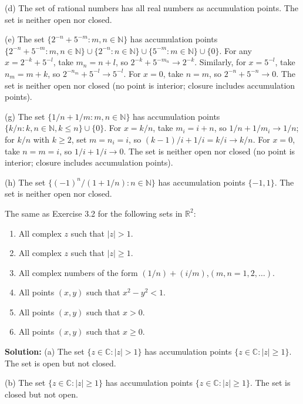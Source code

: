 (d) The set of rational numbers has all real numbers as accumulation points. The set is neither open nor closed.

(e) The set $\{2^{-n} + 5^{-m} : m,n \in \mathbb{N}\}$ has accumulation points $\{2^{-n} + 5^{-m} : m,n \in \mathbb{N}\} \cup \{2^{-n} : n \in \mathbb{N}\} \cup \{5^{-m} : m \in \mathbb{N}\} \cup \{0\}$. For any $x = 2^{-k} + 5^{-l}$, take $m_n = n + l$, so $2^{-k} + 5^{-m_n} \to 2^{-k}$. Similarly, for $x = 5^{-l}$, take $n_m = m + k$, so $2^{-n_m} + 5^{-l} \to 5^{-l}$. For $x = 0$, take $n = m$, so $2^{-n} + 5^{-n} \to 0$. The set is neither open nor closed (no point is interior; closure includes accumulation points).

(g) The set $\{1/n + 1/m : m,n \in \mathbb{N}\}$ has accumulation points $\{k/n : k,n \in \mathbb{N}, k \leq n\} \cup \{0\}$. For $x = k/n$, take $m_i = i + n$, so $1/n + 1/m_i \to 1/n$; for $k/n$ with $k \geq 2$, set $m = n_i = i$, so $(k-1)/i + 1/i = k/i \to k/n$. For $x = 0$, take $n = m = i$, so $1/i + 1/i \to 0$. The set is neither open nor closed (no point is interior; closure includes accumulation points).

(h) The set $\{(-1)^n/(1+1/n) : n \in \mathbb{N}\}$ has accumulation points $\{-1, 1\}$. The set is neither open nor closed.

\begin{problembox}
The same as Exercise 3.2 for the following sets in $\mathbb{R}^2$:
\begin{enumerate}[label=\textbf{(\alph*)}]
\item All complex $z$ such that $|z| > 1$.
\item All complex $z$ such that $|z| \ge 1$.
\item All complex numbers of the form $(1/n) + (i/m)$,\quad $(m, n = 1, 2, \dots)$.
\item All points $(x, y)$ such that $x^2 - y^2 < 1$.
\item All points $(x, y)$ such that $x > 0$.
\item All points $(x, y)$ such that $x \ge 0$.
\end{enumerate}
\end{problembox}

\textbf{Solution:}
(a) The set $\{z \in \mathbb{C} : |z| > 1\}$ has accumulation points $\{z \in \mathbb{C} : |z| \geq 1\}$. The set is open but not closed.

(b) The set $\{z \in \mathbb{C} : |z| \geq 1\}$ has accumulation points $\{z \in \mathbb{C} : |z| \geq 1\}$. The set is closed but not open.


